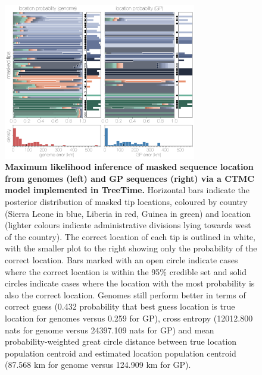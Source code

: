 \documentclass[11pt,oneside,letterpaper]{article}
\begin{document}
\begin{figure}[h]
 \centering
	\includegraphics[width=0.75\textwidth]{supp_figures/sfigX_treetimeLocations.png}
	\caption{\textbf{Maximum likelihood inference of masked sequence location from genomes (left) and GP sequences (right) via a CTMC model implemented in TreeTime.}
  Horizontal bars indicate the posterior distribution of masked tip locations, coloured by country (Sierra Leone in blue, Liberia in red, Guinea in green) and location (lighter colours indicate administrative divisions lying towards west of the country).
  The correct location of each tip is outlined in white, with the smaller plot to the right showing only the probability of the correct location.
  Bars marked with an open circle indicate cases where the correct location is within the 95\% credible set and solid circles indicate cases where the location with the most probability is also the correct location.
  Genomes still perform better in terms of correct guess (0.432 probability that best guess location is true location for genomes versus 0.259 for GP), cross entropy (12012.800 nats for genome versus 24397.109 nats for GP) and mean probability-weighted great circle distance between true location population centroid and estimated location population centroid (87.568 km for genome versus 124.909 km for GP).
	}
	\label{TTlocations}
\end{figure}
\end{document}
